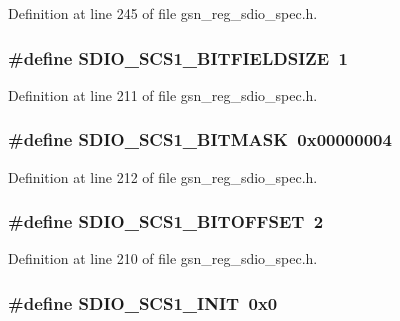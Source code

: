 Definition at line 245 of file gsn\_\-reg\_\-sdio\_\-spec.h.

\hypertarget{a00571_a12a30066dd27924c8a01aeb2cc3b44ab}{
\subsubsection[{SDIO\_\-SCS1\_\-BITFIELDSIZE}]{\setlength{\rightskip}{0pt plus 5cm}\#define SDIO\_\-SCS1\_\-BITFIELDSIZE~1}}
\label{a00571_a12a30066dd27924c8a01aeb2cc3b44ab}


Definition at line 211 of file gsn\_\-reg\_\-sdio\_\-spec.h.

\hypertarget{a00571_a3a5543cd81bbaabaa0efa1106a700e70}{
\subsubsection[{SDIO\_\-SCS1\_\-BITMASK}]{\setlength{\rightskip}{0pt plus 5cm}\#define SDIO\_\-SCS1\_\-BITMASK~0x00000004}}
\label{a00571_a3a5543cd81bbaabaa0efa1106a700e70}


Definition at line 212 of file gsn\_\-reg\_\-sdio\_\-spec.h.

\hypertarget{a00571_ad442b5bcd7a0badb3ca5b6df13458012}{
\subsubsection[{SDIO\_\-SCS1\_\-BITOFFSET}]{\setlength{\rightskip}{0pt plus 5cm}\#define SDIO\_\-SCS1\_\-BITOFFSET~2}}
\label{a00571_ad442b5bcd7a0badb3ca5b6df13458012}


Definition at line 210 of file gsn\_\-reg\_\-sdio\_\-spec.h.

\hypertarget{a00571_affb572018ceabbfb90a5ad8c0b927476}{
\subsubsection[{SDIO\_\-SCS1\_\-INIT}]{\setlength{\rightskip}{0pt plus 5cm}\#define SDIO\_\-SCS1\_\-INIT~0x0}}
\label{a00571_affb572018ceabbfb90a5ad8c0b927476}


